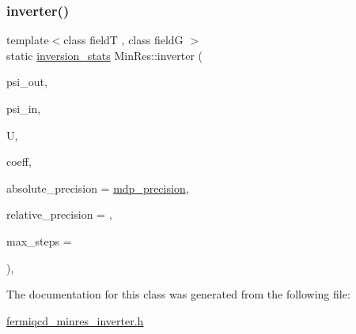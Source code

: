 \subsubsection{\texorpdfstring{inverter()}{inverter()}}
{\footnotesize\ttfamily template$<$class fieldT , class fieldG $>$ \\
static \hyperlink{classinversion__stats}{inversion\+\_\+stats} Min\+Res\+::inverter (\begin{DoxyParamCaption}\item[{fieldT \&}]{psi\+\_\+out,  }\item[{fieldT \&}]{psi\+\_\+in,  }\item[{fieldG \&}]{U,  }\item[{\hyperlink{classcoefficients}{coefficients} \&}]{coeff,  }\item[{\hyperlink{mdp__global__vars_8h_a69d96b74c791e0bbdb888b3913a69450}{mdp\+\_\+real}}]{absolute\+\_\+precision = {\ttfamily \hyperlink{mdp__global__vars_8h_a443a4ca745298420893e113a7ac926a9}{mdp\+\_\+precision}},  }\item[{\hyperlink{mdp__global__vars_8h_a69d96b74c791e0bbdb888b3913a69450}{mdp\+\_\+real}}]{relative\+\_\+precision = {},  }\item[{int}]{max\+\_\+steps = {} }\end{DoxyParamCaption})\hspace{0.3cm}{\ttfamily [inline]}, {\ttfamily [static]}}



The documentation for this class was generated from the following file\+:\begin{DoxyCompactItemize}
\item 
\hyperlink{fermiqcd__minres__inverter_8h}{fermiqcd\+\_\+minres\+\_\+inverter.\+h}\end{DoxyCompactItemize}
